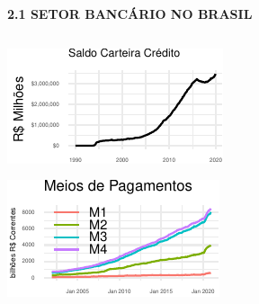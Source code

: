 \documentclass[ignorenonframetext,aspectratio=169,ignorenonframetext]{beamer}
\begin{document}
\begin{frame}{\textbf{2.1 SETOR BANCÁRIO NO BRASIL}}
\begin{columns}[T]
\begin{column}{0.33333\textwidth}
\begin{center}\includegraphics{01-presentation-V1_files/figure-beamer/credit balance-1} \end{center}

\begin{center}\includegraphics{01-presentation-V1_files/figure-beamer/mpplot-1} \end{center}
\end{column}
\end{columns}

\end{frame}
\end{document}
